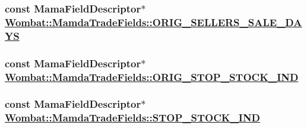 \hypertarget{classWombat_1_1MamdaTradeFields_16b62103586d1e6ea3973e0aa397a00d}{
\subsubsection[ORIG\_\-SELLERS\_\-SALE\_\-DAYS]{\setlength{\rightskip}{0pt plus 5cm}const Mama\-Field\-Descriptor$\ast$ \hyperlink{classWombat_1_1MamdaTradeFields_16b62103586d1e6ea3973e0aa397a00d}{Wombat::Mamda\-Trade\-Fields::ORIG\_\-SELLERS\_\-SALE\_\-DAYS}}}
\label{classWombat_1_1MamdaTradeFields_16b62103586d1e6ea3973e0aa397a00d}


\hypertarget{classWombat_1_1MamdaTradeFields_a6e1f19a93c90ff95093e90177deb9c7}{
\subsubsection[ORIG\_\-STOP\_\-STOCK\_\-IND]{\setlength{\rightskip}{0pt plus 5cm}const Mama\-Field\-Descriptor$\ast$ \hyperlink{classWombat_1_1MamdaTradeFields_a6e1f19a93c90ff95093e90177deb9c7}{Wombat::Mamda\-Trade\-Fields::ORIG\_\-STOP\_\-STOCK\_\-IND}}}
\label{classWombat_1_1MamdaTradeFields_a6e1f19a93c90ff95093e90177deb9c7}


\hypertarget{classWombat_1_1MamdaTradeFields_ef1ba4de27357d660131b2b6c98e8331}{
\subsubsection[STOP\_\-STOCK\_\-IND]{\setlength{\rightskip}{0pt plus 5cm}const Mama\-Field\-Descriptor$\ast$ \hyperlink{classWombat_1_1MamdaTradeFields_ef1ba4de27357d660131b2b6c98e8331}{Wombat::Mamda\-Trade\-Fields::STOP\_\-STOCK\_\-IND}}}
\label{classWombat_1_1MamdaTradeFields_ef1ba4de27357d660131b2b6c98e8331}


